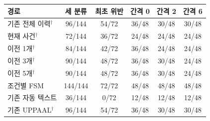 \begin{table}[t]
\centering
\color{revisionblue}
\label{tab:first-results}
\scriptsize
\setlength{\tabcolsep}{2.5pt}
\begin{tabularx}{\columnwidth}{Yccccc}
\toprule
경로 & 세 분류 & 최초 위반 & 간격 0 & 간격 2 & 간격 6 \\
\midrule
기존 전체 이력$^\dagger$ & 96/144 & 54/72 & 36/48 & 30/48 & 30/48 \\
현재 사건$^\dagger$ & 72/144 & 36/72 & 24/48 & 24/48 & 24/48 \\
이전 1개$^\dagger$ & 84/144 & 42/72 & 36/48 & 24/48 & 24/48 \\
이전 3개$^\dagger$ & 90/144 & 48/72 & 36/48 & 30/48 & 24/48 \\
이전 5개$^\dagger$ & 90/144 & 48/72 & 36/48 & 30/48 & 24/48 \\
조건별 FSM & 144/144 & 72/72 & 48/48 & 48/48 & 48/48 \\
기존 자동 텍스트 & 36/144 & 0/72 & 12/48 & 12/48 & 12/48 \\
기존 UPPAAL$^\dagger$ & 96/144 & 54/72 & 36/48 & 30/48 & 30/48 \\
\bottomrule
\end{tabularx}
\end{table}
